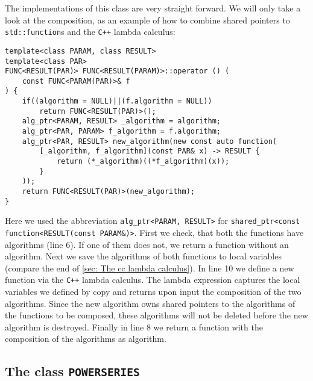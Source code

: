 \documentclass{article}
\newcommand{\cc}{\texttt{C++}\xspace}
\newcommand{\code}[1]{\texttt{#1}}
\newcommand{\func}[1]{\texttt{#1}}
\begin{document}
The implementations of this class are very straight forward. We will only take a look at the composition, as an example of how to combine shared pointers to \code{std::function}s and the \cc lambda calculus:
\begin{lstlisting}
template<class PARAM, class RESULT>
template<class PAR>
FUNC<RESULT(PAR)> FUNC<RESULT(PARAM)>::operator () (
	const FUNC<PARAM(PAR)>& f
) {
	if((algorithm = NULL)||(f.algorithm = NULL))
		return FUNC<RESULT(PAR)>();
	alg_ptr<PARAM, RESULT> _algorithm = algorithm;
	alg_ptr<PAR, PARAM> f_algorithm = f.algorithm;
	alg_ptr<PAR, RESULT> new_algorithm(new const auto function(
		[_algorithm, f_algorithm](const PAR& x) -> RESULT {
			return (*_algorithm)((*f_algorithm)(x));
		}
	));
	return FUNC<RESULT(PAR)>(new_algorithm);
}
\end{lstlisting}
Here we used the abbreviation \code{alg\_ptr<PARAM, RESULT>} for \code{shared\_ptr<const function<RESULT(const PARAM\&)>}. First we check, that both the functions have algorithms (line 6). If one of them does not, we return a function without an algorithm. Next we save the algorithms of both functions to local variables (compare the end of \cref{sec: The cc lambda calculus}). In line 10 we define a new function via the \cc lambda calculus. The lambda expression captures the local variables we defined by copy and returns upon input the composition of the two algorithms. Since the new algorithm owns shared pointers to the algorithms of the functions to be composed, these algorithms will not be deleted before the new algorithm is destroyed. Finally in line 8 we return a function with the composition of the algorithms as algorithm.


\subsection{The class \func{POWERSERIES}}
\end{document}
